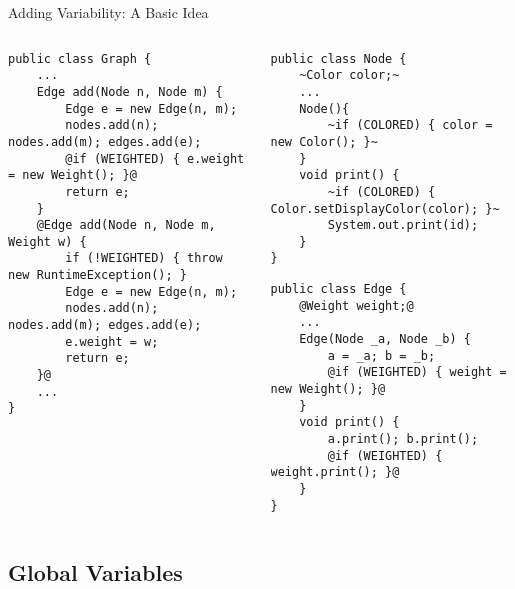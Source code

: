 \begin{frame}[fragile]{Adding Variability: A Basic Idea}
		\begin{columns}
				\vspace{5mm}
\begin{tiny}
\begin{lstlisting}
public class Graph {
	...
	Edge add(Node n, Node m) {
		Edge e = new Edge(n, m);
		nodes.add(n); nodes.add(m); edges.add(e);
		@if (WEIGHTED) { e.weight = new Weight(); }@
		return e;
	}
	@Edge add(Node n, Node m, Weight w) {
		if (!WEIGHTED) { throw new RuntimeException(); }
		Edge e = new Edge(n, m);
		nodes.add(n); nodes.add(m); edges.add(e);
		e.weight = w;
		return e;
	}@
	...
}
\end{lstlisting}
\end{tiny}	
\begin{tiny}
\begin{lstlisting}
public class Node {
	~Color color;~
	...
	Node(){
		~if (COLORED) { color = new Color(); }~
	}
	void print() {
		~if (COLORED) { Color.setDisplayColor(color); }~
		System.out.print(id);
	}
}
\end{lstlisting}
\begin{lstlisting}
public class Edge {
	@Weight weight;@ 
	...
	Edge(Node _a, Node _b) {
		a = _a; b = _b;
		@if (WEIGHTED) { weight = new Weight(); }@
	}
	void print() {
		a.print(); b.print();
		@if (WEIGHTED) { weight.print(); }@
	}
}
\end{lstlisting}
\end{tiny}	
		\end{columns}
\end{frame}

\subsection{Global Variables}

